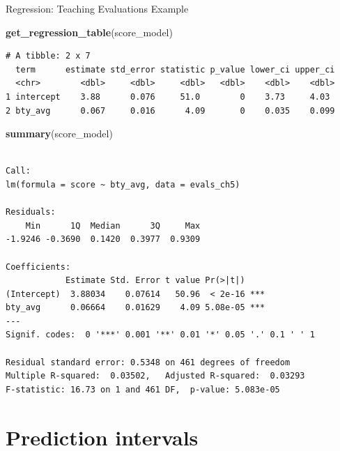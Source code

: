 \documentclass[
  ignorenonframetext,
]{beamer}
\newenvironment{Shaded}{\begin{snugshade}}{\end{snugshade}}
\newcommand{\FunctionTok}[1]{\textcolor[rgb]{0.13,0.29,0.53}{\textbf{#1}}}
\newcommand{\NormalTok}[1]{#1}
\begin{document}
\begin{frame}[fragile]{Regression: Teaching Evaluations Example}
\protect\hypertarget{regression-teaching-evaluations-example-15}{}
\tiny

\begin{Shaded}
\begin{Highlighting}[]
\FunctionTok{get\_regression\_table}\NormalTok{(score\_model)}
\end{Highlighting}
\end{Shaded}

\begin{verbatim}
# A tibble: 2 x 7
  term      estimate std_error statistic p_value lower_ci upper_ci
  <chr>        <dbl>     <dbl>     <dbl>   <dbl>    <dbl>    <dbl>
1 intercept    3.88      0.076     51.0        0    3.73     4.03 
2 bty_avg      0.067     0.016      4.09       0    0.035    0.099
\end{verbatim}

\begin{Shaded}
\begin{Highlighting}[]
\FunctionTok{summary}\NormalTok{(score\_model)}
\end{Highlighting}
\end{Shaded}

\begin{verbatim}

Call:
lm(formula = score ~ bty_avg, data = evals_ch5)

Residuals:
    Min      1Q  Median      3Q     Max 
-1.9246 -0.3690  0.1420  0.3977  0.9309 

Coefficients:
            Estimate Std. Error t value Pr(>|t|)    
(Intercept)  3.88034    0.07614   50.96  < 2e-16 ***
bty_avg      0.06664    0.01629    4.09 5.08e-05 ***
---
Signif. codes:  0 '***' 0.001 '**' 0.01 '*' 0.05 '.' 0.1 ' ' 1

Residual standard error: 0.5348 on 461 degrees of freedom
Multiple R-squared:  0.03502,   Adjusted R-squared:  0.03293 
F-statistic: 16.73 on 1 and 461 DF,  p-value: 5.083e-05
\end{verbatim}

\normalsize
\end{frame}

\hypertarget{prediction-intervals}{%
\section{Prediction intervals}\label{prediction-intervals}}
\end{document}
